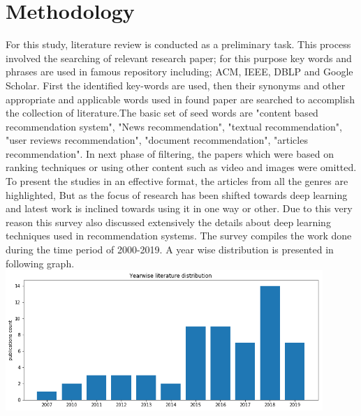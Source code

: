 \section{Methodology}
For this study, literature review is conducted as a preliminary task. This process involved the searching of relevant research paper; for this purpose key words and phrases are used in famous repository including; ACM, IEEE, DBLP and Google Scholar. First the identified key-words are used, then their synonyms and other appropriate and applicable words used in found paper are searched to accomplish the collection of literature.The basic set of seed words are "content based recommendation system", "News recommendation", "textual recommendation", "user reviews recommendation", "document recommendation", "articles recommendation". In next phase of filtering, the papers which were based on ranking techniques or using other content such as video and images were omitted. 
To present the studies in an effective format, the articles from all the genres are highlighted, But as the focus of research has been shifted towards deep learning and latest work is inclined towards using it in one way or other. Due to this very reason this survey also discussed extensively the details about deep learning techniques used in recommendation systems. The survey compiles the work done during the time period of 2000-2019. A year wise distribution is presented in following graph.
\newline
\includegraphics[width=12cm]{images/literaturedistribution.png}
\newline


